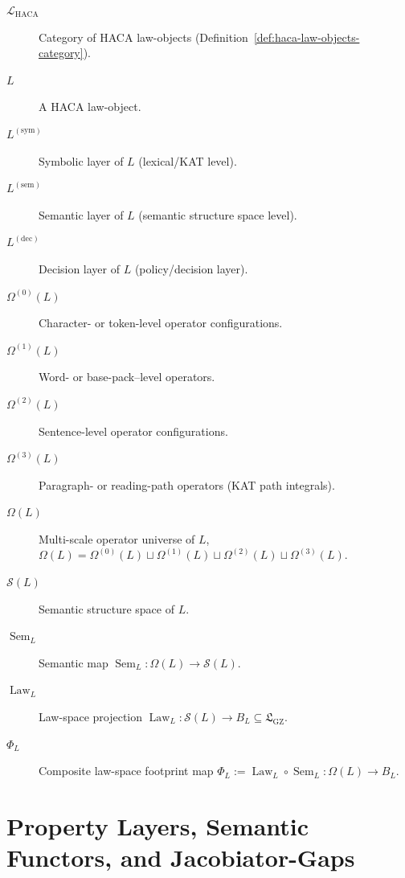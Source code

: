 \documentclass[11pt]{book}
\theoremstyle{plain}
\theoremstyle{definition}
\theoremstyle{remark}
\newcommand{\GZLS}{\ensuremath{\mathfrak{L}_{\mathrm{GZ}}}}       \newcommand{\GZLT}{\ensuremath{M_{!w}}}                           \newcommand{\GZLOC}{\ensuremath{A_M}}                             \newcommand{\GZLC}{\ensuremath{\omega_{\mathrm{law}}}}            \newcommand{\GZLCurv}{\ensuremath{\mathcal{F}_{\mathrm{law}}}}
\begin{document}
\begin{description}
  \item[$\mathcal{L}_{\mathrm{HACA}}$] Category of HACA law-objects
        (Definition~\ref{def:haca-law-objects-category}).
  \item[$L$] A HACA law-object.
  \item[$L^{(\mathrm{sym})}$] Symbolic layer of $L$ (lexical/KAT level).
  \item[$L^{(\mathrm{sem})}$] Semantic layer of $L$ (semantic
        structure space level).
  \item[$L^{(\mathrm{dec})}$] Decision layer of $L$ (policy/decision
        layer).
  \item[$\Omega^{(0)}(L)$] Character- or token-level operator
        configurations.
  \item[$\Omega^{(1)}(L)$] Word- or base-pack–level operators.
  \item[$\Omega^{(2)}(L)$] Sentence-level operator configurations.
  \item[$\Omega^{(3)}(L)$] Paragraph- or reading-path operators (KAT
        path integrals).
  \item[$\Omega(L)$] Multi-scale operator universe of $L$,
        \(
          \Omega(L)=\Omega^{(0)}(L)\sqcup\Omega^{(1)}(L)
          \sqcup\Omega^{(2)}(L)\sqcup\Omega^{(3)}(L)
        \).
  \item[$\mathcal{S}(L)$] Semantic structure space of $L$.
  \item[$\operatorname{Sem}_L$] Semantic map
        $\operatorname{Sem}_L:\Omega(L)\to\mathcal{S}(L)$.
  \item[$\operatorname{Law}_L$] Law-space projection
        $\operatorname{Law}_L:\mathcal{S}(L)\to B_L\subseteq\GZLS$.
  \item[$\Phi_L$] Composite law-space footprint map
        $\Phi_L:=\operatorname{Law}_L\circ\operatorname{Sem}_L:
         \Omega(L)\to B_L$.
\end{description}

\section*{Property Layers, Semantic Functors, and Jacobiator-Gaps}
\end{document}
